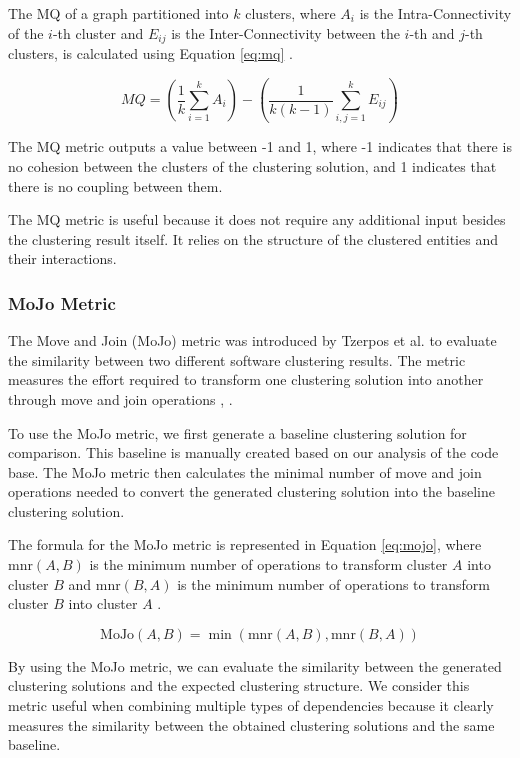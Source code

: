 \documentclass{ieeeaccess}
\begin{document}
The MQ of a graph partitioned into \( k \) clusters, where \( A_i \) is the Intra-Connectivity of the \( i \)-th cluster and \( E_{ij} \) is the Inter-Connectivity between the \( i \)-th and \( j \)-th clusters, is calculated using Equation \eqref{eq:mq} \cite{b2}.

\begin{equation}
MQ = \left( \frac{1}{k} \sum_{i=1}^{k} A_i \right) - \left( \frac{1}{k(k-1)} \sum_{i,j=1}^{k} E_{ij} \right)
\label{eq:mq}
\end{equation}

The MQ metric outputs a value between -1 and 1, where -1 indicates that there is no cohesion between the clusters of the clustering solution, and 1 indicates that there is no coupling between them.

The MQ metric is useful because it does not require any additional input besides the clustering result itself. It relies on the structure of the clustered entities and their interactions. 

\subsubsection{MoJo Metric}

The Move and Join (MoJo) metric was introduced by Tzerpos et al. to evaluate the similarity between two different software clustering results. The metric measures the effort required to transform one clustering solution into another through move and join operations \cite{b3}, \cite{b11}.

To use the MoJo metric, we first generate a baseline clustering solution for comparison. This baseline is manually created based on our analysis of the code base. The MoJo metric then calculates the minimal number of move and join operations needed to convert the generated clustering solution into the baseline clustering solution.

The formula for the MoJo metric is represented in Equation \eqref{eq:mojo}, where \( \text{mnr}(A, B) \) is the minimum number of operations to transform cluster \( A \) into cluster \( B \) and \( \text{mnr}(B, A) \) is the minimum number of operations to transform cluster \( B \) into cluster \( A \) \cite{b3}. 


\begin{equation}
\text{MoJo}(A, B) = \min(\text{mnr}(A, B), \text{mnr}(B, A))
\label{eq:mojo}
\end{equation}

By using the MoJo metric, we can evaluate the similarity between the generated clustering solutions and the expected clustering structure. We consider this metric useful when combining multiple types of dependencies because it clearly measures the similarity between the obtained clustering solutions and the same baseline.
\end{document}
